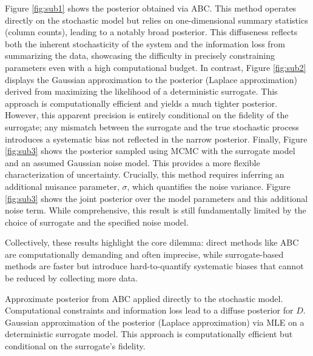 \documentclass{article}
\providecommand{\DIFdeltex}[1]{{\protect\color{red} \scriptsize #1}} %
\providecommand{\DIFdelFL}[1]{\DIFdel{#1}} %
\providecommand{\DIFdel}[1]{\texorpdfstring{\DIFdeltex{#1}}{}} %
\begin{document}
\DIFdel{Figure \ref{fig:sub1} shows the posterior obtained via ABC. This method operates directly on the stochastic model but relies on one-dimensional summary statistics (column counts), leading to a notably broad posterior. This diffuseness reflects both the inherent stochasticity of the system and the information loss from summarizing the data, showcasing the difficulty in precisely constraining parameters even with a high computational budget. In contrast, Figure \ref{fig:sub2} displays the Gaussian approximation to the posterior (Laplace approximation) derived from maximizing the likelihood of a deterministic surrogate. This approach is computationally efficient and yields a much tighter posterior. However, this apparent precision is entirely conditional on the fidelity of the surrogate; any mismatch between the surrogate and the true stochastic process introduces a systematic bias not reflected in the narrow posterior. Finally, Figure \ref{fig:sub3} shows the posterior sampled using MCMC with the surrogate model and an assumed Gaussian noise model. This provides a more flexible characterization of uncertainty. Crucially, this method requires inferring an additional nuisance parameter, $\sigma$, which quantifies the noise variance. Figure \ref{fig:sub3} shows the joint posterior over the model parameters and this additional noise term. While comprehensive, this result is still fundamentally limited by the choice of surrogate and the specified noise model. 
}%

\DIFdel{Collectively, these results highlight the core dilemma: direct methods like ABC are computationally demanding and often imprecise, while surrogate-based methods are faster but introduce hard-to-quantify systematic biases that cannot be reduced by collecting more data.
}%

{%
\DIFdelFL{Approximate posterior from ABC applied directly to the stochastic model. Computational constraints and information loss lead to a diffuse posterior for $D$.}}
{%
\DIFdelFL{Gaussian approximation of the posterior (Laplace approximation) via MLE on a deterministic surrogate model. This approach is computationally efficient but conditional on the surrogate's fidelity.}}
\end{document}
